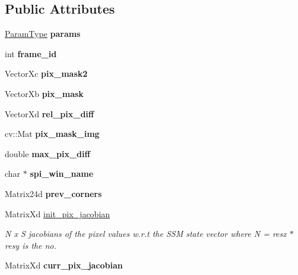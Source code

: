 \subsection*{Public Attributes}
\begin{DoxyCompactItemize}
\item 
\hypertarget{classFESMBase_ad833897d1bda90e59209b474bdb0cdf6}{\hyperlink{structFESMParams}{Param\-Type} {\bfseries params}}\label{classFESMBase_ad833897d1bda90e59209b474bdb0cdf6}

\item 
\hypertarget{classFESMBase_a644eb5767a50e0620844201fbee77d63}{int {\bfseries frame\-\_\-id}}\label{classFESMBase_a644eb5767a50e0620844201fbee77d63}

\item 
\hypertarget{classFESMBase_a173bb869a75c3871003a49bde1f143cb}{Vector\-Xc {\bfseries pix\-\_\-mask2}}\label{classFESMBase_a173bb869a75c3871003a49bde1f143cb}

\item 
\hypertarget{classFESMBase_a39da3447ecd99fa16fedd103260d1043}{Vector\-Xb {\bfseries pix\-\_\-mask}}\label{classFESMBase_a39da3447ecd99fa16fedd103260d1043}

\item 
\hypertarget{classFESMBase_ae1d98232c2b4d658cdd4424504165b00}{Vector\-Xd {\bfseries rel\-\_\-pix\-\_\-diff}}\label{classFESMBase_ae1d98232c2b4d658cdd4424504165b00}

\item 
\hypertarget{classFESMBase_a1f0a176d87626f95609427a346c009c0}{cv\-::\-Mat {\bfseries pix\-\_\-mask\-\_\-img}}\label{classFESMBase_a1f0a176d87626f95609427a346c009c0}

\item 
\hypertarget{classFESMBase_a1ae62610166d11e22e1c2895d03e5e1c}{double {\bfseries max\-\_\-pix\-\_\-diff}}\label{classFESMBase_a1ae62610166d11e22e1c2895d03e5e1c}

\item 
\hypertarget{classFESMBase_a15411a400a6c5dd4c3b3b46c3b2a02d9}{char $\ast$ {\bfseries spi\-\_\-win\-\_\-name}}\label{classFESMBase_a15411a400a6c5dd4c3b3b46c3b2a02d9}

\item 
\hypertarget{classFESMBase_a2c6a93ada38a61c26115942ed145b63c}{Matrix24d {\bfseries prev\-\_\-corners}}\label{classFESMBase_a2c6a93ada38a61c26115942ed145b63c}

\item 
Matrix\-Xd \hyperlink{classFESMBase_a34b1dddc4fb6e3f4187e0388cb8684f2}{init\-\_\-pix\-\_\-jacobian}
\begin{DoxyCompactList}\small\item\em N x S jacobians of the pixel values w.\-r.\-t the S\-S\-M state vector where N = resx $\ast$ resy is the no. \end{DoxyCompactList}\item 
\hypertarget{classFESMBase_ad4c68c2bd2d2681e17ac78e7a4a6fe21}{Matrix\-Xd {\bfseries curr\-\_\-pix\-\_\-jacobian}}\label{classFESMBase_ad4c68c2bd2d2681e17ac78e7a4a6fe21}


\end{DoxyCompactItemize}
